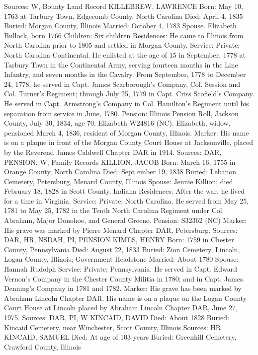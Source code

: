 Sources: W, Bounty Land Record 
KILLEBREW, LAWRENCE
Born: May 10, 1763 at Tarbury Town, Edgecomb County, North Carolina
Died: April 4, 1835
Buried: Morgan County, Illinois Married: October 4, 1783 Spouse. Elizabeth Bullock, born 1766
Children: Six children 
Residences: He came to Illinois from North Carolina prior to 1805 and settled in Morgan County.
Service: Private; North Carolina Continental. He enlisted at the age of 15 in September, 1778 at Tarbury Town in the Continental Army, serving fourteen months in the Line Infantry, and seven months in the Cavalry. From September, 1778 to December 24, 1778, he served in Capt. James Scarborough's Company, Col. Session and Col. Turner's Regiment; through July 25, 1779 in Capt. Criss Scofield's Company. He served in Capt. Armstrong's Company in Col. Hamilton's Regiment until his separation from service in June, 1780. 
Pension: Illinois Pension Roll, Jackson County, July 30, 1834, age 70. Elizabeth W24816 (NC). Elizabeth, widow, pensioned March 4, 1836, resident of Morgan County, Illinois. 
Marker: His name is on a plaque in front of the Morgan County Court House at Jacksonville, placed by the Reverend James Caldwell Chapter DAR in 1914. 
Sources: DAR, PENSION, W, Family Records 
KILLION, JACOB
Born: March 16, 1755 in Orange County, North Carolina
Died: Sept ember 19, 1838
Buried: Lebanon Cemetery, Petersburg, Menard County, Illinois
Spouse: Jennie Killion; died February 18, 1828 in Scott County, Indiana
Residences: After the war, he lived for a time in Virginia.
Service: Private; North Carolina. He served from May 25, 1781 to May 25, 1782 in the Tenth North Carolina Regiment under Col. Abraham, Major Donohoe, and General Greene. Pension: S32362 (NC)
Marker: His grave was marked by Pierre Menard Chapter DAR, Petersburg.
Sources: DAR, HR, NSDAH, PI, PENSION 
KIMES, HENRY 
Born: 1759 in Chester County, Pennsylvania 
Died: August 22, 1833 
Buried: Zion Cemetery, Lincoln, Logan County, Illinois; Government Headstone 
Married: About 1780 
Spouse: Hannah Rudolph
Service: Private; Pennsylvania. He served in Capt. Edward Vernon's Company in the Chester County Militia in 1780; and in Capt. James Denning's Company in 1781 and 1782.
Marker: His grave has been marked by Abraham Lincoln Chapter DAR. His name is on a plaque on the Logan County Court House at Lincoln placed by Abraham Lincoln Chapter DAR, June 27, 1975.
Sources: DAR, PI, W 
KINCAID, DAVID
Died: About 1828
Buried: Kincaid Cemetery, near Winchester, Scott County, Illinois
Sources: HR 
KINCAID, SAMUEL 
Died: At age of 103 years
Buried: Greenhill Cemetery, Crawford County, Illinois 
